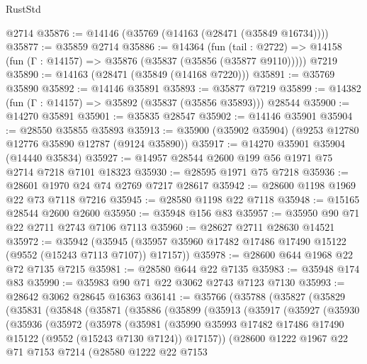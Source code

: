 \begin{lexlean}{RustStd}
\begin{coremodule}
    @2714
@35876 := @14146 (@35769 (@14163 (@28471 (@35849 @16734))))
@35877 := @35859 @2714
@35886 := @14364
    (fun (tail : @2722) => @14158 (fun (Γ : @14157) => @35876 (@35837 (@35856 (@35877 @9110)))))
    @7219
@35890 := @14163 (@28471 (@35849 (@14168 @7220)))
@35891 := @35769 @35890
@35892 := @14146 @35891
@35893 := @35877 @7219
@35899 := @14382 (fun (Γ : @14157) => @35892 (@35837 (@35856 @35893))) @28544
@35900 := @14270 @35891
@35901 := @35835 @28547
@35902 := @14146 @35901
@35904 := @28550 @35855 @35893
@35913 := @35900 (@35902 @35904) (@9253 @12780 @12776 @35890 @12787 (@9124 @35890))
@35917 := @14270 @35901 @35904 (@14440 @35834)
@35927 := @14957 @28544 @2600 @199 @56 @1971 @75 @2714 @7218 @7101 @18323
@35930 := @28595 @1971 @75 @7218
@35936 := @28601 @1970 @24 @74 @2769 @7217 @28617
@35942 := @28600 @1198 @1969 @22 @73 @7118 @7216
@35945 := @28580 @1198 @22 @7118
@35948 := @15165 @28544 @2600 @2600
@35950 := @35948 @156 @83
@35957 := @35950 @90 @71 @22 @2711 @2743 @7106 @7113
@35960 := @28627 @2711 @28630 @14521
@35972 := @35942
    (@35945 (@35957 @35960 @17482 @17486 @17490 @15122 (@9552 (@15243 @7113 @7107)) @17157))
@35978 := @28600 @644 @1968 @22 @72 @7135 @7215
@35981 := @28580 @644 @22 @7135
@35983 := @35948 @174 @83
@35990 := @35983 @90 @71 @22 @3062 @2743 @7123 @7130
@35993 := @28642 @3062 @28645 @16363
@36141 := @35766
    (@35788
      (@35827
        (@35829
          (@35831
            (@35848
              (@35871
                (@35886
                  (@35899
                    (@35913
                      (@35917
                        (@35927
                          (@35930
                            (@35936
                              (@35972
                                (@35978
                                  (@35981
                                    (@35990
                                      @35993
                                      @17482
                                      @17486
                                      @17490
                                      @15122
                                      (@9552 (@15243 @7130 @7124))
                                      @17157))
                                  (@28600
                                    @1222
                                    @1967
                                    @22
                                    @71
                                    @7153
                                    @7214
                                    (@28580
                                      @1222
                                      @22
                                      @7153

\end{coremodule}
\end{lexlean}
